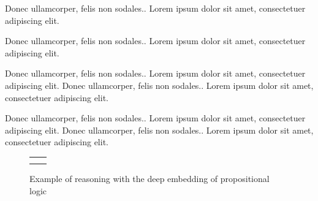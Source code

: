 \documentclass[oneside,12pt]{article}
\begin{document}
Donec ullamcorper, felis non sodales.. Lorem  ipsum  dolor  sit  amet,  consectetuer  adipiscing  
elit.

{\advance\leftskip\mathindent
  \advance\leftskip\mathindent
  


}

Donec ullamcorper, felis non sodales.. Lorem  ipsum  dolor  sit  amet,  consectetuer  adipiscing  
elit.

{\advance\leftskip\mathindent
  \advance\leftskip\mathindent



}

Donec ullamcorper, felis non sodales.. Lorem  ipsum  dolor  sit  amet,  consectetuer  adipiscing  
elit. 
Donec ullamcorper, felis non sodales.. Lorem  ipsum  dolor  sit  amet,  consectetuer  adipiscing  
elit.

{\centering }


Donec ullamcorper, felis non sodales.. Lorem  ipsum  dolor  sit  amet,  consectetuer  adipiscing  
elit. 
Donec ullamcorper, felis non sodales.. Lorem ipsum  dolor  sit  amet,  consectetuer  adipiscing  
elit.


\begin{figure}
  \caption{Example of reasoning with the deep embedding of propositional logic}
  \centering
  
  \begin{tabular}{cc}
    \centering
    \begin{minipage}[t]{0.45\textwidth}
      \centering
      
    \end{minipage}

    &
   
      \begin{minipage}[t]{0.45\textwidth}
        \centering
        
      \end{minipage}
      
    \\
    
    \multicolumn{2}{c}{
    \begin{minipage}{0.9\textwidth}
      \centering
      \vspace{-0.5cm}
      
    \end{minipage}}
 
  \end{tabular}

\end{figure}
\end{document}
